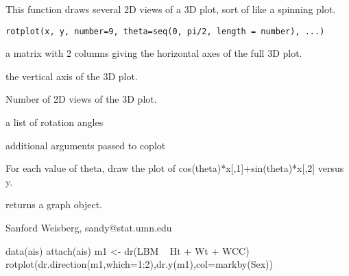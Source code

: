 \begin{Description}\relax
This function draws several 2D views of a 3D plot, sort of like a spinning
plot.
\end{Description}
\begin{Usage}
\begin{verbatim}
rotplot(x, y, number=9, theta=seq(0, pi/2, length = number), ...)
\end{verbatim}
\end{Usage}
\begin{Arguments}
\begin{ldescription}
\item[\code{x}] a matrix with 2 columns giving the horizontal axes of the full 3D
plot.
\item[\code{y}] the vertical axis of the 3D plot.
\item[\code{number}] Number of 2D views of the 3D plot.
\item[\code{theta}] a list of rotation angles
\item[\code{...}] additional arguments passed to coplot
\end{ldescription}
\end{Arguments}
\begin{Details}\relax
For each value of theta, draw the plot of cos(theta)*x[,1]+sin(theta)*x[,2]
versus y.
\end{Details}
\begin{Value}
returns a graph object.
\end{Value}
\begin{Author}\relax
Sanford Weisberg, sandy@stat.umn.edu
\end{Author}
\begin{Examples}
\begin{ExampleCode}
 data(ais)
 attach(ais)
 m1 <- dr(LBM ~ Ht + Wt + WCC)  
 rotplot(dr.direction(m1,which=1:2),dr.y(m1),col=markby(Sex))
  \end{ExampleCode}
\end{Examples}

